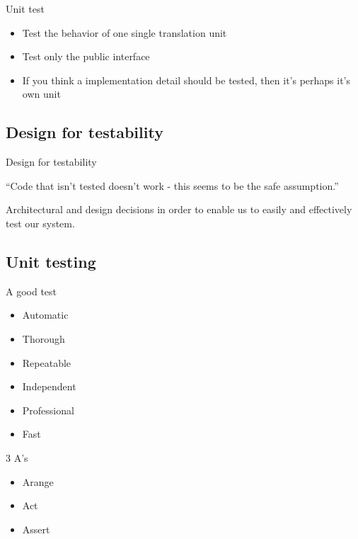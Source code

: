 \documentclass{beamer}
\begin{document}
\begin{frame}{Unit test}
\begin{itemize}
  \item Test the behavior of one single translation unit
  \item Test only the public interface
  \item If you think a implementation detail should be tested, then it's perhaps
    it's own unit
\end{itemize}
\end{frame}

\subsection{Design for testability}
\begin{frame}{Design for testability}
\begin{exampleblock}{}
  {\large ``Code that isn't tested doesn't work - this seems to be the safe
  assumption.''}
  \vskip5mm
  
  \hspace*{}
\end{exampleblock}
\end{frame}

\begin{frame}
Architectural and design decisions in order to enable us to easily and
effectively test our system.
\end{frame}

\subsection{Unit testing}

\begin{frame}{A good test}
\begin{itemize}
  \item Automatic
  \item Thorough
  \item Repeatable
  \item Independent
  \item Professional
  \item Fast
\end{itemize}
\end{frame}

\begin{frame}{3 A's}
\begin{itemize}
  \item Arange
  \item Act
  \item Assert
\end{itemize}
\end{frame}
\end{document}
